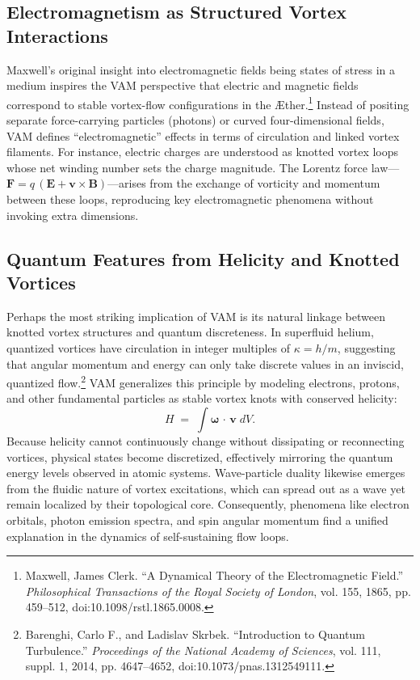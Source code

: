 \documentclass[aps,preprint,superscriptaddress]{revtex4-2}
\begin{document}
    \subsection{Electromagnetism as Structured Vortex Interactions}

    Maxwell’s original insight into electromagnetic fields being states of stress in a medium inspires the VAM perspective that electric and magnetic fields correspond to stable vortex-flow configurations in the Æther.\footnote{Maxwell, James Clerk. “A Dynamical Theory of the Electromagnetic Field.” \textit{Philosophical Transactions of the Royal Society of London}, vol. 155, 1865, pp. 459–512, doi:10.1098/rstl.1865.0008.} Instead of positing separate force-carrying particles (photons) or curved four-dimensional fields, VAM defines “electromagnetic” effects in terms of circulation and linked vortex filaments. For instance, electric charges are understood as knotted vortex loops whose net winding number sets the charge magnitude. The Lorentz force law—\(\mathbf{F} = q\,(\mathbf{E} + \mathbf{v}\times\mathbf{B})\)—arises from the exchange of vorticity and momentum between these loops, reproducing key electromagnetic phenomena without invoking extra dimensions.

    \subsection{Quantum Features from Helicity and Knotted Vortices}

    Perhaps the most striking implication of VAM is its natural linkage between knotted vortex structures and quantum discreteness. In superfluid helium, quantized vortices have circulation in integer multiples of \(\kappa = h / m\), suggesting that angular momentum and energy can only take discrete values in an inviscid, quantized flow.\footnote{Barenghi, Carlo F., and Ladislav Skrbek. “Introduction to Quantum Turbulence.” \textit{Proceedings of the National Academy of Sciences}, vol. 111, suppl. 1, 2014, pp. 4647–4652, doi:10.1073/pnas.1312549111.} VAM generalizes this principle by modeling electrons, protons, and other fundamental particles as stable vortex knots with conserved helicity:
    \[
        H \;=\; \int \boldsymbol{\omega} \,\cdot\, \mathbf{v}\; dV.
    \]
    Because helicity cannot continuously change without dissipating or reconnecting vortices, physical states become discretized, effectively mirroring the quantum energy levels observed in atomic systems. Wave-particle duality likewise emerges from the fluidic nature of vortex excitations, which can spread out as a wave yet remain localized by their topological core. Consequently, phenomena like electron orbitals, photon emission spectra, and spin angular momentum find a unified explanation in the dynamics of self-sustaining flow loops.
\end{document}
